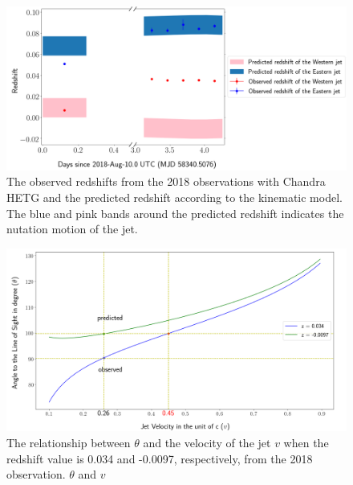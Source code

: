 \begin{figure}
    \centering
    \includegraphics[width = \linewidth]{Chapters/Figures/redshiftv6.png}
    \caption{The observed redshifts from the 2018 observations with Chandra HETG and the predicted redshift according to the kinematic model. The blue and pink bands around the predicted redshift indicates the nutation motion of the jet.}
    \label{redshift}
\end{figure}


\begin{figure}[h!]
    \centering
    \includegraphics[width = \linewidth]{Chapters/Figures/thetav2.png}
    \caption{The relationship between $\theta$ and the velocity of the jet $v$ when the redshift value is 0.034 and -0.0097, respectively, from the 2018 observation. $\theta$ and $v$ }
    \label{thetav}
\end{figure}





